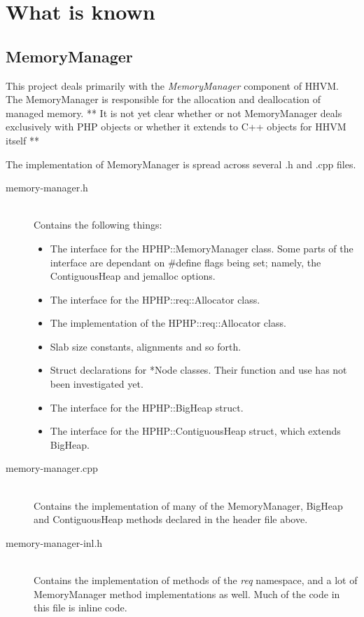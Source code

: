 \chapter{What is known}
\section{MemoryManager}
This project deals primarily with the \emph{MemoryManager} component of HHVM. The MemoryManager is responsible for the allocation and deallocation of managed memory. ** It is not yet clear whether or not MemoryManager deals exclusively with PHP objects or whether it extends to C++ objects for HHVM itself **

The implementation of MemoryManager is spread across several .h and .cpp files.

\begin{description}
  \item[memory-manager.h] \hfill \\
    Contains the following things:
    \begin{itemize}
      \item The interface for the HPHP::MemoryManager class. Some parts of the interface are dependant on \#define flags being set; namely, the ContiguousHeap and jemalloc options.
      \item The interface for the HPHP::req::Allocator class.
      \item The implementation of the HPHP::req::Allocator class.
      \item Slab size constants, alignments and so forth.
      \item Struct declarations for *Node classes. Their function and use has not been investigated yet.
      \item The interface for the HPHP::BigHeap struct.
      \item The interface for the HPHP::ContiguousHeap struct, which extends BigHeap.
    \end{itemize}

  \item[memory-manager.cpp] \hfill \\
    Contains the implementation of many of the MemoryManager, BigHeap and ContiguousHeap methods declared in the header file above.

  \item[memory-manager-inl.h] \hfill \\
    Contains the implementation of methods of the \emph{req} namespace, and a lot of MemoryManager method implementations as well. Much of the code in this file is inline code.


\end{description}
